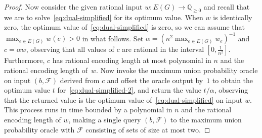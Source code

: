 \documentclass[10pt,a4paper]{amsart}
\begin{document}
\begin{proof}
Now consider the given rational input $w:E(G)\rightarrow \mathbb{Q}_{\geq 0}$
and recall that we are to solve~\eqref{eq:dual-simplified} for its
optimum value. 
When $w$ is identically zero, the optimum value of~\eqref{eq:dual-simplified} 
is zero, so we can assume that $\max_{e\in E(G)}w(e)>0$ in what follows. 
Set $\alpha=(n^2\max_{e\in E(G)}w_e)^{-1}$ and $c=\alpha w$, observing that
all values of $c$ are rational in the interval $[0,\frac{1}{n^2}]$. 
Furthermore, $c$ has rational encoding length at most 
polynomial in $n$ and the rational encoding length of~$w$. 
Now invoke the maximum union probability oracle on input $(b,\mathcal{F})$
derived from $c$ and offset the oracle output by~$1$ to obtain the optimum 
value $t$ for~\eqref{eq:dual-simplified-2}, and return the value 
$t/\alpha$, observing that the returned value is the optimum value
of~\eqref{eq:dual-simplified} on input $w$. This process runs in time
bounded by a polynomial in $n$ and the rational encoding length of $w$,
making a single query $(b,\mathcal{F})$ to the maximum union probability 
oracle with $\mathcal{F}$ consisting of sets of size at most two. 
\end{proof}
\end{document}
